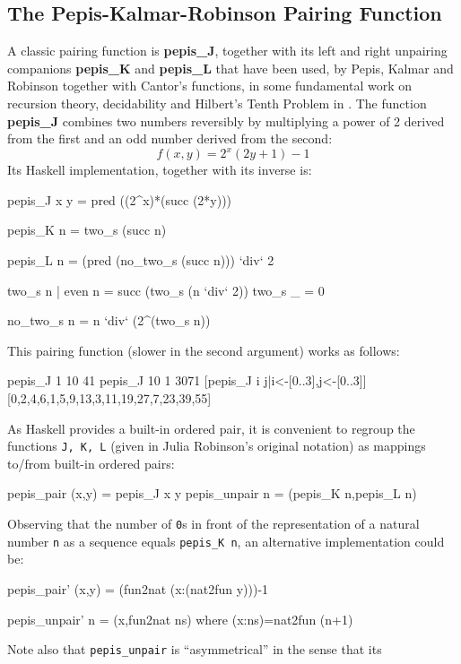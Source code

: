 \documentclass[]{INCLUDES/llncs}
\begin{document}
\subsection{The Pepis-Kalmar-Robinson Pairing Function} \label{pepispair}
A classic pairing function is {\bf pepis\_J}, together with its left and right
unpairing companions {\bf pepis\_K} and {\bf pepis\_L} that have been used, by Pepis, Kalmar and Robinson 
together with Cantor's functions, in some fundamental work on recursion theory, 
decidability and Hilbert's Tenth Problem in
\cite{pepis,kalmar1,kalmar2,kalmar3,robinson50,robinson55,robinson68a,robinsons68b,robinson67}.
The function {\bf pepis\_J}
combines two numbers reversibly by multiplying
a power of 2 derived from the first and
an odd number derived from the second:
\begin{equation}
f(x,y)=2^x(2y+1)-1
\end{equation}
Its Haskell implementation, together with its inverse is:
\begin{code}
pepis_J x y  = pred ((2^x)*(succ (2*y)))

pepis_K n = two_s (succ n)

pepis_L n = (pred (no_two_s (succ n))) `div` 2
 
two_s n | even n = succ (two_s (n `div` 2))
two_s _ = 0

no_two_s n = n `div` (2^(two_s n))
\end{code}
This pairing function (slower in the second argument) works as follows:
\begin{codex}
pepis_J 1 10
  41
pepis_J 10 1
  3071
[pepis_J i j|i<-[0..3],j<-[0..3]]
  [0,2,4,6,1,5,9,13,3,11,19,27,7,23,39,55]
\end{codex}
As Haskell provides a built-in ordered pair, it is convenient to regroup the
functions {\tt J, K, L} (given in Julia Robinson's original notation) as
mappings to/from built-in ordered pairs:
\begin{code}
pepis_pair (x,y) = pepis_J x y
pepis_unpair n = (pepis_K n,pepis_L n)
\end{code}
Observing that the number of {\tt 0}s in front of the
representation of a natural number {\tt n} as a sequence 
equals {\tt pepis\_K n}, an alternative
implementation could be:
\begin{code}
pepis_pair' (x,y) = (fun2nat (x:(nat2fun y)))-1

pepis_unpair' n = (x,fun2nat ns) where 
  (x:ns)=nat2fun (n+1) 
\end{code} 
Note also that {\tt pepis\_unpair} is ``asymmetrical'' in the sense that its
\end{document}
